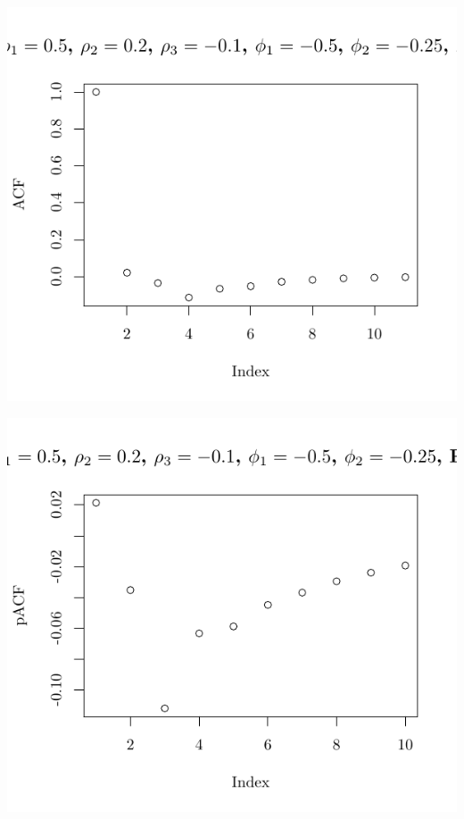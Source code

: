 \documentclass[10pt]{paper}\usepackage[]{graphicx}\usepackage[]{color}
\makeatletter
\def\maxwidth{ %
  \ifdim\Gin@nat@width>\linewidth
    \linewidth
  \else
    \Gin@nat@width
  \fi
}
\newenvironment{knitrout}{}{} %
\makeatother
\begin{document}
\begin{knitrout}
{\centering \includegraphics[width=\maxwidth]{figure/graphics-plotter-193} 

}




{\centering \includegraphics[width=\maxwidth]{figure/graphics-plotter-194} 

}





\end{knitrout}
\end{document}
